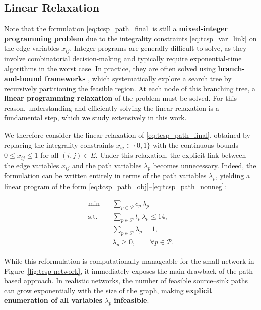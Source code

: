 \documentclass{book}
\theoremstyle{definition}
\newcounter{algorithm_}
\numberwithin{algorithm_}{chapter}
\begin{document}
\subsection{Linear Relaxation}
Note that the formulation \eqref{eq:tcsp_path_final} is still a \textbf{mixed-integer programming problem} due to the integrality constraints \eqref{eq:tcsp_var_link} on the edge variables $x_{ij}$.
Integer programs are generally difficult to solve, as they involve combinatorial decision-making and typically require exponential-time algorithms in the worst case. In practice, they are often solved using \textbf{branch-and-bound frameworks} \cite{vanderbeck2000dantzig, ryan1981integer}, which systematically explore a search tree by recursively partitioning the feasible region. At each node of this branching tree, a \textbf{linear programming relaxation} of the problem must be solved. 
For this reason, understanding and efficiently solving the linear relaxation is a fundamental step, which we study extensively in this work. 

\bigskip

We therefore consider the linear relaxation of \eqref{eq:tcsp_path_final}, obtained by replacing the integrality constraints $x_{ij} \in \{0,1\}$ with the continuous bounds $0 \le x_{ij} \le 1$ for all $(i,j) \in E$. 
Under this relaxation, the explicit link between the edge variables $x_{ij}$ and the path variables $\lambda_p$ becomes unnecessary. 
Indeed, the formulation can be written entirely in terms of the path variables $\lambda_p$, yielding a linear program of the form
\eqref{eq:tcsp_path_obj}--\eqref{eq:tcsp_path_nonneg}: 

\begin{subequations}\label{eq:tcsp_path_relax}
\begin{align}
\min \quad & \sum_{p \in \mathcal{P}} c_p \, \lambda_p \label{eq:tcsp_path_obj_relax} \\[2mm]
\text{s.t.} \quad 
& \sum_{p \in \mathcal{P}} t_p \, \lambda_p \le 14, \label{eq:tcsp_path_time_relax} \\[1mm]
& \sum_{p \in \mathcal{P}} \lambda_p = 1, \label{eq:tcsp_path_convexity_relax} \\[1mm]
& \lambda_p \ge 0, \qquad \forall p \in \mathcal{P}. \label{eq:tcsp_path_nonneg_relax}
\end{align}
\end{subequations}


While this reformulation is computationally manageable for the small network in Figure~\ref{fig:tcsp-network}, it immediately exposes the main drawback of the path-based approach. In realistic networks, the number of feasible source--sink paths can grow exponentially with the size of the graph, making \textbf{explicit enumeration of all variables} $\lambda_p$ \textbf{infeasible}.
\end{document}
